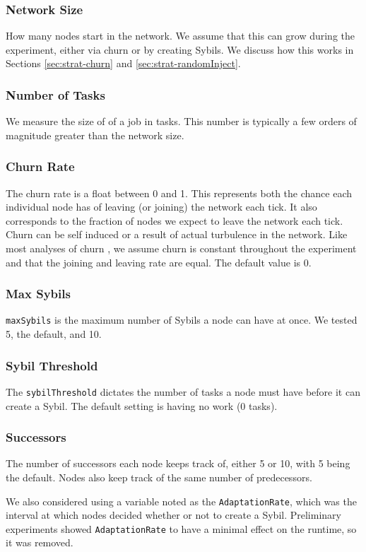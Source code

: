 \documentclass[11pt,conference]{IEEEtran}
\begin{document}
\subsubsection*{Network Size}  How many nodes start in the network.  
We assume that this can grow during the experiment, either via churn or by creating Sybils.
We discuss how this works in Sections \ref{sec:strat-churn} and \ref{sec:strat-randomInject}.
\subsubsection*{Number of Tasks} We measure the size of of a job in tasks.
This number is typically a few orders of magnitude greater than the network size.
\subsubsection*{Churn Rate} The churn rate is a float between 0 and 1.
This represents both the chance each individual node has of leaving (or joining) the network each tick.
It also corresponds to the fraction of nodes we expect to leave the network each tick.
Churn can be self induced or a result of actual turbulence in the network.
Like most analyses of churn \cite{marozzo2012p2p}, we assume churn is constant throughout the experiment and that the joining and leaving rate are equal.
The default value is 0.
\subsubsection*{Max Sybils} \texttt{maxSybils} is the maximum number of Sybils a node can have at once.  We tested 5, the default, and 10.
\subsubsection*{Sybil Threshold} The \texttt{sybilThreshold} dictates the number of tasks a node must have before it can create a Sybil.  The default setting is having no work (0 tasks).
\subsubsection*{Successors} The number of successors each node keeps track of, either 5 or 10, with 5 being the default.
Nodes also keep track of the same number of predecessors.
	

We also considered using a variable noted as the \texttt{AdaptationRate}, which was the interval at which nodes decided whether or not to create a Sybil.
Preliminary experiments showed \texttt{AdaptationRate} to have a minimal effect on the runtime, so it was removed.
\end{document}
